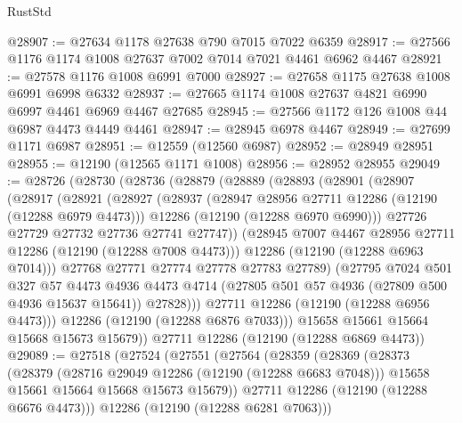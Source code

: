 \begin{lexlean}{RustStd}
\begin{coremodule}
@28907 := @27634 @1178 @27638 @790 @7015 @7022 @6359
@28917 := @27566 @1176 @1174 @1008 @27637 @7002 @7014 @7021 @4461 @6962 @4467
@28921 := @27578 @1176 @1008 @6991 @7000
@28927 := @27658 @1175 @27638 @1008 @6991 @6998 @6332
@28937 := @27665 @1174 @1008 @27637 @4821 @6990 @6997 @4461 @6969 @4467 @27685
@28945 := @27566 @1172 @126 @1008 @44 @6987 @4473 @4449 @4461
@28947 := @28945 @6978 @4467
@28949 := @27699 @1171 @6987
@28951 := @12559 (@12560 @6987)
@28952 := @28949 @28951
@28955 := @12190 (@12565 @1171 @1008)
@28956 := @28952 @28955
@29049 := @28726
    (@28730
      (@28736
        (@28879
          (@28889
            (@28893
              (@28901
                (@28907
                  (@28917
                    (@28921
                      (@28927
                        (@28937
                          (@28947 @28956 @27711 @12286 (@12190 (@12288 @6979 @4473)))
                          @12286
                          (@12190 (@12288 @6970 @6990)))
                        @27726
                        @27729
                        @27732
                        @27736
                        @27741
                        @27747))
                    (@28945 @7007 @4467 @28956 @27711 @12286 (@12190 (@12288 @7008 @4473)))
                    @12286
                    (@12190 (@12288 @6963 @7014)))
                  @27768
                  @27771
                  @27774
                  @27778
                  @27783
                  @27789)
                (@27795
                  @7024
                  @501
                  @327
                  @57
                  @4473
                  @4936
                  @4473
                  @4714
                  (@27805 @501 @57 @4936 (@27809 @500 @4936 @15637 @15641))
                  @27828)))
            @27711
            @12286
            (@12190 (@12288 @6956 @4473)))
          @12286
          (@12190 (@12288 @6876 @7033)))
        @15658
        @15661
        @15664
        @15668
        @15673
        @15679))
    @27711
    @12286
    (@12190 (@12288 @6869 @4473))
@29089 := @27518
    (@27524
      (@27551
        (@27564
          (@28359
            (@28369
              (@28373
                (@28379
                  (@28716 @29049 @12286 (@12190 (@12288 @6683 @7048)))
                  @15658
                  @15661
                  @15664
                  @15668
                  @15673
                  @15679))
              @27711
              @12286
              (@12190 (@12288 @6676 @4473)))
            @12286
            (@12190 (@12288 @6281 @7063)))

\end{coremodule}
\end{lexlean}

